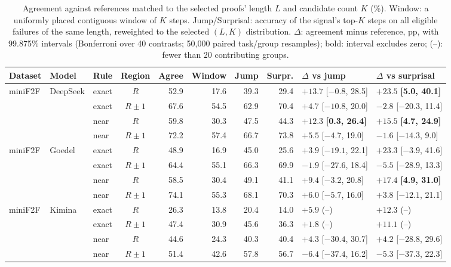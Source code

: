 \begin{table}[h]
\caption{Agreement against references matched to the selected proofs' length $L$ and candidate count $K$ (\%). Window: a uniformly placed contiguous window of $K$ steps. Jump/Surprisal: accuracy of the signal's top-$K$ steps on all eligible failures of the same length, reweighted to the selected $(L,K)$ distribution. $\Delta$: agreement minus reference, pp, with 99.875\% intervals (Bonferroni over 40 contrasts; 50,000 paired task/group resamples); bold: interval excludes zero; (--): fewer than 20 contributing groups.}
\label{tab:matched}
\begin{center}
\scriptsize
\setlength{\tabcolsep}{2.2pt}
\begin{tabular}{lllcrrrrll}
\toprule
Dataset & Model & Rule & Region & Agree & Window & Jump & Surpr. & $\Delta$ vs jump & $\Delta$ vs surprisal\\
\midrule
miniF2F & DeepSeek & exact & $R$ & 52.9 & 17.6 & 39.3 & 29.4 & $+13.7$ [$-0.8$, 28.5] & $\mathbf{+23.5}$ \textbf{[5.0, 40.1]}\\
 & & exact & $R\pm1$ & 67.6 & 54.5 & 62.9 & 70.4 & $+4.7$ [$-10.8$, 20.0] & $-2.8$ [$-20.3$, 11.4]\\
 & & near & $R$ & 59.8 & 30.3 & 47.5 & 44.3 & $\mathbf{+12.3}$ \textbf{[0.3, 26.4]} & $\mathbf{+15.5}$ \textbf{[4.7, 24.9]}\\
 & & near & $R\pm1$ & 72.2 & 57.4 & 66.7 & 73.8 & $+5.5$ [$-4.7$, 19.0] & $-1.6$ [$-14.3$, 9.0]\\
miniF2F & Goedel & exact & $R$ & 48.9 & 16.9 & 45.0 & 25.6 & $+3.9$ [$-19.1$, 22.1] & $+23.3$ [$-3.9$, 41.6]\\
 & & exact & $R\pm1$ & 64.4 & 55.1 & 66.3 & 69.9 & $-1.9$ [$-27.6$, 18.4] & $-5.5$ [$-28.9$, 13.3]\\
 & & near & $R$ & 58.5 & 30.4 & 49.1 & 41.1 & $+9.4$ [$-3.2$, 20.8] & $\mathbf{+17.4}$ \textbf{[4.9, 31.0]}\\
 & & near & $R\pm1$ & 74.1 & 55.3 & 68.1 & 70.3 & $+6.0$ [$-5.7$, 16.0] & $+3.8$ [$-12.1$, 21.1]\\
miniF2F & Kimina & exact & $R$ & 26.3 & 13.8 & 20.4 & 14.0 & $+5.9$ (--) & $+12.3$ (--)\\
 & & exact & $R\pm1$ & 47.4 & 30.9 & 45.6 & 36.3 & $+1.8$ (--) & $+11.1$ (--)\\
 & & near & $R$ & 44.6 & 24.3 & 40.3 & 40.4 & $+4.3$ [$-30.4$, 30.7] & $+4.2$ [$-28.8$, 29.6]\\
 & & near & $R\pm1$ & 51.4 & 42.6 & 57.8 & 56.7 & $-6.4$ [$-37.4$, 16.2] & $-5.3$ [$-37.3$, 22.3]\\

\end{tabular}
\end{center}
\end{table}
